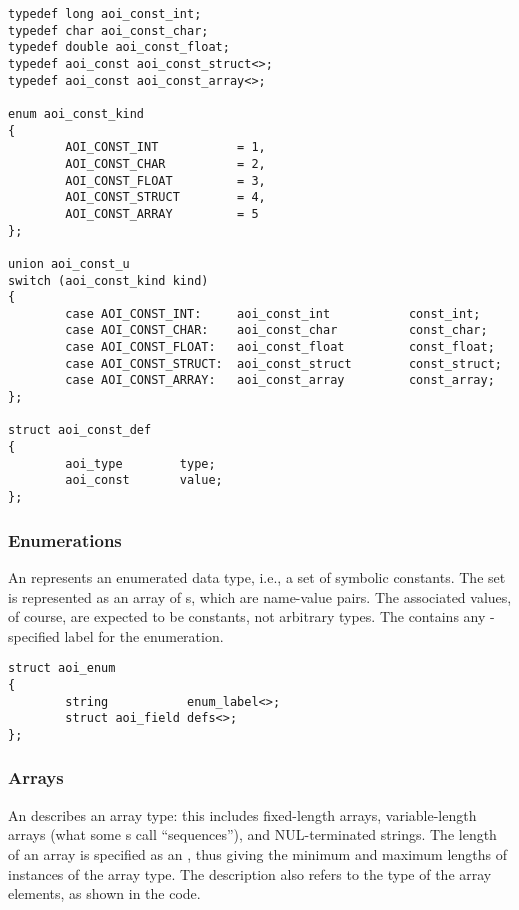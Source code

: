 \begin{verbatim}
typedef long aoi_const_int;
typedef char aoi_const_char;
typedef double aoi_const_float;
typedef aoi_const aoi_const_struct<>;
typedef aoi_const aoi_const_array<>;

enum aoi_const_kind
{
        AOI_CONST_INT           = 1,
        AOI_CONST_CHAR          = 2,
        AOI_CONST_FLOAT         = 3,
        AOI_CONST_STRUCT        = 4,
        AOI_CONST_ARRAY         = 5
};

union aoi_const_u
switch (aoi_const_kind kind)
{
        case AOI_CONST_INT:     aoi_const_int           const_int;
        case AOI_CONST_CHAR:    aoi_const_char          const_char;
        case AOI_CONST_FLOAT:   aoi_const_float         const_float;
        case AOI_CONST_STRUCT:  aoi_const_struct        const_struct;
        case AOI_CONST_ARRAY:   aoi_const_array         const_array;
};

struct aoi_const_def
{
        aoi_type        type;
        aoi_const       value;
};
\end{verbatim}


\subsubsection{Enumerations}

An  represents an enumerated data type, i.e., a set of symbolic
constants.  The set is represented as an array of s, which are
name-value pairs.  The associated values, of course, are expected to be
constants, not arbitrary \AOI{} types.  The  contains any
\IDL{}-specified label for the enumeration.

\begin{verbatim}
struct aoi_enum
{
        string           enum_label<>;
        struct aoi_field defs<>;
};
\end{verbatim}


\subsubsection{Arrays}

An  describes an array type: this includes fixed-length arrays,
variable-length arrays (what some \IDL{}s call ``sequences''), and
NUL-terminated strings.  The length of an array is specified as an
, thus giving the minimum and maximum lengths of instances of
the array type.  The  description also refers to the type of the
array elements, as shown in the code.

